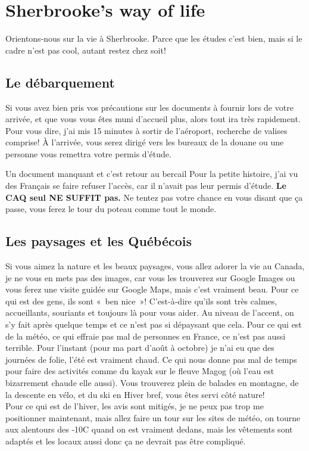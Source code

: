 \chapter{Sherbrooke's way of life}\label{ch:ch4label}

Orientons-nous sur la vie à Sherbrooke. Parce que les études c'est bien, mais si le cadre n’est pas cool, autant restez chez soit!

\section{Le débarquement}\label{sec:sec4.1}
Si vous avez bien pris vos précautions sur les documents à fournir lors de votre arrivée, et que vous vous êtes muni d'accueil plus, alors tout ira très rapidement. Pour vous dire, j'ai mis 15 minutes à sortir de l'aéroport, recherche de valises comprise! À l'arrivée, vous serez dirigé vers les bureaux de la douane ou une personne vous remettra votre permis d'étude.


\begin{example}{Un document manquant et c'est retour au bercail}
  Pour la petite histoire, j’ai vu des Français se faire refuser l’accès, car il n’avait pas leur permis d’étude. \textbf{Le CAQ seul NE SUFFIT pas.} Ne tentez pas votre chance en vous disant que ça passe, vous ferez le tour du poteau comme tout le monde.
\end{example}


\section{Les paysages et les Québécois}\label{sec:sec4.2}
Si vous aimez la nature et les beaux paysages, vous allez adorer la vie au Canada, je ne vous en mets pas des images, car vous les trouverez sur Google Images ou vous ferez une visite guidée sur Google Maps, mais c’est vraiment beau.
Pour ce qui est des gens, ils sont « ben nice »! C’est-à-dire qu’ils sont très calmes, accueillants, souriants et toujours là pour vous aider. Au niveau de l’accent, on s’y fait après quelque temps et ce n’est pas si dépaysant que cela.
Pour ce qui est de la météo, ce qui effraie pas mal de personnes en France, ce n’est pas aussi terrible. Pour l’instant (pour ma part d’août à octobre) je n’ai eu que des journées de folie, l’été est vraiment chaud. Ce qui nous donne pas mal de temps pour faire des activités comme du kayak sur le fleuve Magog (où l’eau est bizarrement chaude elle aussi). Vous trouverez plein de balades en montagne, de la descente en vélo, et du ski en Hiver bref, vous êtes servi côté nature! \\
Pour ce qui est de l’hiver, les avis sont mitigés, je ne peux pas trop me positionner maintenant, mais allez faire un tour sur les sites de météo, on tourne aux alentours des -10C quand on est vraiment dedans, mais les vêtements sont adaptés et les locaux aussi donc ça ne devrait pas être compliqué.


